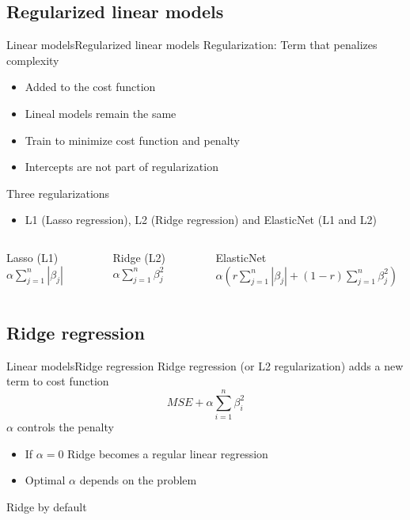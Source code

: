 \documentclass[10pt,compress]{beamer} %
\begin{document}
\subsection{Regularized linear models}
\begin{frame}{Linear models}{Regularized linear models}
	\alert{Regularization}: Term that penalizes complexity
	\begin{itemize}
		\item Added to the cost function
        \item Lineal models remain the same
        \item Train to minimize cost function and penalty
        \item Intercepts are not part of regularization
	\end{itemize}

    Three regularizations
	\begin{itemize}
		\item L1 (Lasso regression),  L2 (Ridge regression) and ElasticNet (L1 and L2)
	\end{itemize}

    \begin{columns}
    		\begin{block}{Lasso (L1)}
            	$\alpha \sum_{j=1}^n |\beta_j|$
        	\end{block}

     		\begin{block}{Ridge (L2)}
            	$\alpha \sum_{j=1}^n \beta_j^2$
        	\end{block}

     		\begin{block}{ElasticNet}
			   $\alpha \left( r \sum_{j=1}^n |\beta_j| + (1-r) \sum_{j=1}^n \beta_j^2 \right)$
        	\end{block}
    \end{columns}
\end{frame}

\subsection{Ridge regression}
\begin{frame}{Linear models}{Ridge regression}
	Ridge regression (or L2 regularization) adds a new term to cost function
    \begin{equation*}
        MSE + \alpha \sum_{i=1}^n \beta_i^2
    \end{equation*}
    $\alpha$ controls the penalty
	\begin{itemize}
		\item If $\alpha = 0$ Ridge becomes a regular linear regression
        \item Optimal $\alpha$ depends on the problem
	\end{itemize}
    Ridge by default
\end{frame}
\end{document}
